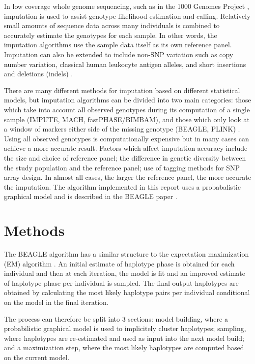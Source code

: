 \documentclass[a4paper,10pt,twoside,abstraction,titlepage]{article}
\begin{document}
In low coverage whole genome sequencing, such as in the 1000 Genomes Project \cite{1000genomes}, imputation is used to assist genotype likelihood estimation and calling.  Relatively small amounts of sequence data across many individuals is combined to accurately estimate the genotypes for each sample.  In other words, the imputation algorithms use the sample data itself as its own reference panel.  Imputation can also be extended to include non-SNP variation such as copy number variation, classical human leukocyte antigen alleles, and short insertions and deletions (indels) \cite{review2010}.

There are many different methods for imputation based on different statistical models, but imputation algorithms can be divided into two main categories: those which take into account all observed genotypes during its computation of a single sample (IMPUTE, MACH, fastPHASE/BIMBAM), and those which only look at a window of markers either side of the missing genotype (BEAGLE, PLINK) \cite{review2009}.  Using all observed genotypes is computationally expensive but in many cases can achieve a more accurate result.  Factors which affect imputation accuracy include the size and choice of reference panel; the difference in genetic diversity between the study population and the reference panel; use of tagging methods for SNP array design.  In almost all cases, the larger the reference panel, the more accurate the imputation.  The algorithm implemented in this report uses a probabalistic graphical model and is described in the BEAGLE paper \cite{beagle3}.


\newpage
\section{Methods}
The BEAGLE algorithm has a similar structure to the expectation maximization (EM) algorithm \cite{EMalgorithm}.  An initial estimate of haplotype phase is obtained for each individual and then at each iteration, the model is fit and an improved estimate of haplotype phase per individual is sampled.  The final output haplotypes are obtained by calculating the most likely haplotype pairs per individual conditional on the model in the final iteration.

The process can therefore be split into 3 sections: model building, where a probabilistic graphical model is used to implicitely cluster haplotypes; sampling, where haplotypes are re-estimated and used as input into the next model build; and a maximization step, where the most likely haplotypes are computed based on the current model.
\end{document}
